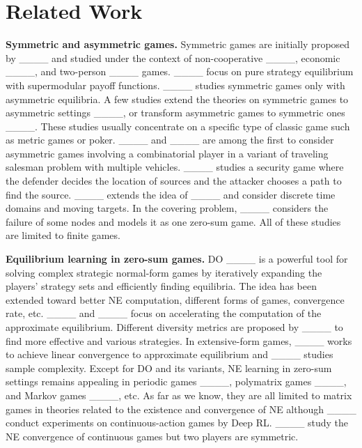 \section{Related Work}


\textbf{Symmetric and asymmetric games.} Symmetric games are initially proposed by ____ and studied under the context of non-cooperative ____, economic ____, and two-person ____ games. ____ focus on pure strategy equilibrium with supermodular payoff functions. ____ studies symmetric games only with asymmetric equilibria. A few studies extend the theories on symmetric games to asymmetric settings ____, or transform asymmetric games to symmetric ones ____. These studies usually concentrate on a specific type of classic game such as metric games or poker.
____ and ____ are among the first to consider asymmetric games involving a combinatorial player in a variant of traveling salesman problem with multiple vehicles. ____ studies a security game where the defender decides the location of sources and the attacker chooses a path to find the source. ____ extends the idea of ____ and consider discrete time domains and moving targets. In the covering problem, ____ considers the failure of some nodes and models it as one zero-sum game. All of these studies are limited to finite games.



\textbf{Equilibrium learning in zero-sum games.} DO ____ is a powerful tool for solving complex strategic normal-form games by iteratively expanding the players' strategy sets and efficiently finding equilibria. The idea has been extended toward better NE computation, different forms of games, convergence rate, etc. ____ and ____ focus on accelerating the computation of the approximate equilibrium. Different diversity metrics are proposed by ____ to find more effective and various strategies. In extensive-form games, ____ works to achieve linear convergence to approximate equilibrium and ____ studies sample complexity. Except for DO and its variants, NE learning in zero-sum settings remains appealing in periodic games ____, polymatrix games ____, and Markov games ____, etc. As far as we know, they are all limited to matrix games in theories related to the existence and convergence of NE although ____ conduct experiments on continuous-action games by Deep RL. ____ study the NE convergence of continuous games but two players are symmetric.

